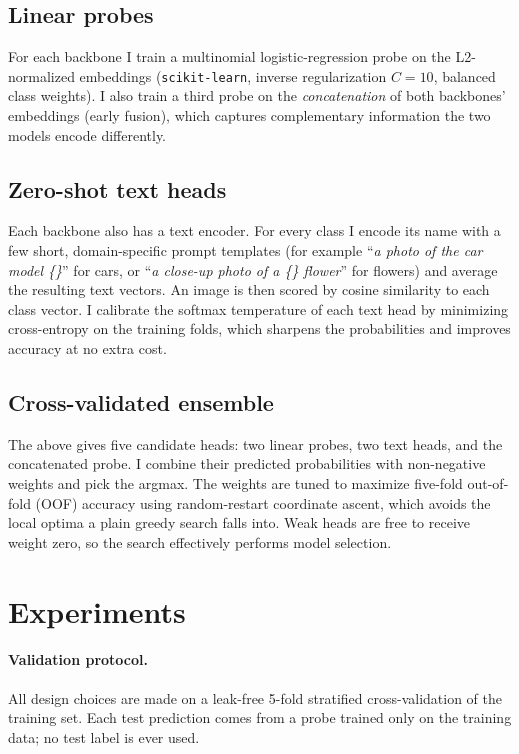 \documentclass[11pt]{article}
\begin{document}
\subsection{Linear probes}
For each backbone I train a multinomial logistic-regression probe on the
L2-normalized embeddings (\texttt{scikit-learn}, inverse regularization $C=10$,
balanced class weights). I also train a third probe on the \emph{concatenation} of
both backbones' embeddings (early fusion), which captures complementary information
the two models encode differently.

\subsection{Zero-shot text heads}
Each backbone also has a text encoder. For every class I encode its name with a
few short, domain-specific prompt templates (for example
``\emph{a photo of the car model \{\}}'' for cars, or
``\emph{a close-up photo of a \{\} flower}'' for flowers) and average the resulting
text vectors. An image is then scored by cosine similarity to each class vector.
I calibrate the softmax temperature of each text head by minimizing
cross-entropy on the training folds, which sharpens the probabilities and improves
accuracy at no extra cost.

\subsection{Cross-validated ensemble}
The above gives five candidate heads: two linear probes, two text heads, and the
concatenated probe. I combine their predicted probabilities with non-negative
weights and pick the argmax. The weights are tuned to maximize five-fold
out-of-fold (OOF) accuracy using random-restart coordinate ascent, which avoids
the local optima a plain greedy search falls into. Weak heads are free to receive
weight zero, so the search effectively performs model selection.

\section{Experiments}

\paragraph{Validation protocol.} All design choices are made on a leak-free
5-fold stratified cross-validation of the training set. Each test prediction comes
from a probe trained only on the training data; no test label is ever used.
\end{document}
